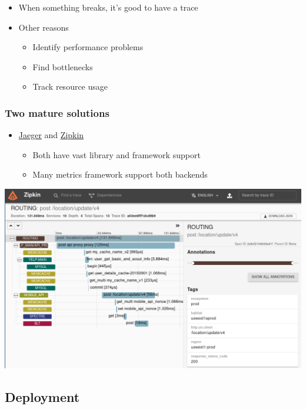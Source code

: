 \documentclass[8pt]{article}
\begin{document}
\begin{itemize}
\item When something breaks, it's good to have a trace

\item Other reasons
\begin{itemize}
\item Identify performance problems
\item Find bottlenecks
\item Track resource usage
\end{itemize}
\end{itemize}
\subsubsection{Two mature solutions}
\label{sec:orge52f482}
\begin{itemize}
\item \href{https://www.jaegertracing.io/}{Jaeger} and \href{https://zipkin.io/}{Zipkin}
\begin{itemize}
\item Both have vast library and framework support
\item Many metrics framework support both backends
\end{itemize}
\end{itemize}
\begin{center}
\includegraphics[width=.9\linewidth]{graphics/zipkin.png}
\end{center}
\subsection{Deployment}
\label{sec:org0f77b03}
\end{document}
